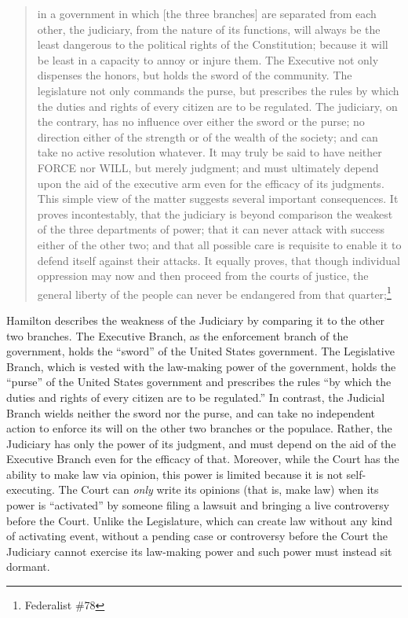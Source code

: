 \begin{quote}
in a government in which [the three branches] are separated from each other, the judiciary, from the nature of its functions, will always be the least dangerous to the political rights of the Constitution; because it will be least in a capacity to annoy or injure them. 
The Executive not only dispenses the honors, but holds the sword of the community. 
The legislature not only commands the purse, but prescribes the rules by which the duties and rights of every citizen are to be regulated. 
The judiciary, on the contrary, has no influence over either the sword or the purse; 
no direction either of the strength or of the wealth of the society; and 
can take no active resolution whatever. 
It may truly be said to have neither FORCE nor WILL, but merely judgment; and must ultimately depend upon the aid of the executive arm even for the efficacy of its judgments.
This simple view of the matter suggests several important consequences. 
It proves incontestably, that the judiciary is beyond comparison the weakest of the three departments of power; 
that it can never attack with success either of the other two; and 
that all possible care is requisite to enable it to defend itself against their attacks. 
It equally proves, that though individual oppression may now and then proceed from the courts of justice, the general liberty of the people can never be endangered from that quarter;\footnote{Federalist \#78}
\end{quote}

Hamilton describes the weakness of the Judiciary by comparing it to the other two branches.  The Executive Branch, as the enforcement branch of the government, holds the ``sword'' of the United States government.  The Legislative Branch, which is vested with the law-making power of the government, holds the ``purse'' of the United States government and prescribes the rules ``by which the duties and rights of every citizen are to be regulated.''  In contrast, the Judicial Branch wields neither the sword nor the purse, and can take no independent action to enforce its will on the other two branches or the populace.  Rather, the Judiciary has only the power of its judgment, and must depend on the aid of the Executive Branch even for the efficacy of that.  Moreover, while the Court has the ability to make law via opinion, this power is limited because it is not self-executing.  The Court can \textit{only} write its opinions (that is, make law) when its power is ``activated'' by someone filing a lawsuit and bringing a live controversy before the Court.  Unlike the Legislature, which can create law without any kind of activating event, without a pending case or controversy before the Court the Judiciary cannot exercise its law-making power and such power must instead sit dormant.

